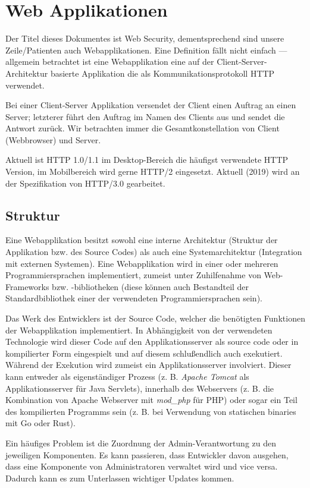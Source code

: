 \chapter{Web Applikationen}

Der Titel dieses Dokumentes ist Web Security, dementsprechend sind unsere Zeile/Patienten auch Webapplikationen. Eine Definition fällt nicht einfach --- allgemein betrachtet ist eine Webapplikation eine auf der Client-Server-Architektur basierte Applikation die als Kommunikationsprotokoll HTTP verwendet.

Bei einer Client-Server Applikation versendet der Client einen Auftrag an einen Server; letzterer führt den Auftrag im Namen des Clients aus und sendet die Antwort zurück. Wir betrachten immer die Gesamtkonstellation von Client (Webbrowser) und Server.

Aktuell ist HTTP 1.0/1.1 im Desktop-Bereich die häufigst verwendete HTTP Version, im Mobilbereich wird gerne HTTP/2 eingesetzt. Aktuell (2019) wird an der Spezifikation von HTTP/3.0 gearbeitet.

\section{Struktur}

Eine Webapplikation besitzt sowohl eine interne Architektur (Struktur der Applikation bzw. des Source Codes) als auch eine Systemarchitektur (Integration mit externen Systemen). Eine Webapplikation wird in einer oder mehreren Programmiersprachen implementiert, zumeist unter Zuhilfenahme von Web-Frameworks bzw. -bibliotheken (diese können auch Bestandteil der Standardbibliothek einer der verwendeten Programmiersprachen sein).

Das Werk des Entwicklers ist der Source Code, welcher die benötigten Funktionen der Webapplikation implementiert. In Abhängigkeit von der verwendeten Technologie wird dieser Code auf den Applikationsserver als source code oder in kompilierter Form eingespielt und auf diesem schlußendlich auch exekutiert. Während der Exekution wird zumeist ein Applikationsserver involviert. Dieser kann entweder als eigenständiger Prozess (z. B. \textit{Apache Tomcat} als Applikationsserver für Java Servlets), innerhalb des Webservers (z. B. die Kombination von Apache Webserver mit \textit{mod\_php} für PHP) oder sogar ein Teil des kompilierten Programms sein (z. B. bei Verwendung von statischen binaries mit Go oder Rust).

Ein häufiges Problem ist die Zuordnung der Admin-Verantwortung zu den jeweiligen Komponenten. Es kann passieren, dass Entwickler davon ausgehen, dass eine Komponente von Administratoren verwaltet wird und vice versa. Dadurch kann es zum Unterlassen wichtiger Updates kommen.

